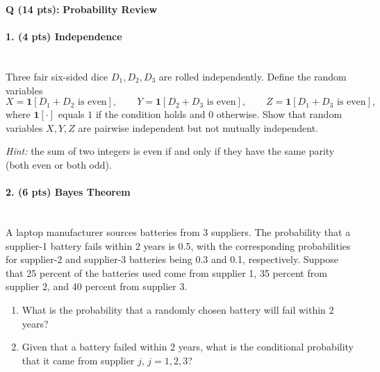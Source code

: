 \documentclass{article}
\newcounter{questionno}
\newcounter{partno}
\newcommand{\question}[1]{
\noindent
\newline
\stepcounter{questionno}
\setcounter{partno}{0}
{\bf \large Q\arabic{questionno} (#1 pts): }
}
\begin{document}
\newpage

\question{14} {\bf \large Probability Review}
\paragraph{1. (4 pts) Independence }~\\

Three fair six-sided dice $D_1, D_2, D_3$ are rolled independently. Define the random variables
\[
X = \mathbf{1}[D_1 + D_2 \text{ is even}],\qquad
Y = \mathbf{1}[D_2 + D_3 \text{ is even}],\qquad
Z = \mathbf{1}[D_1 + D_3 \text{ is even}],
\]
where $\mathbf{1}[\cdot]$ equals $1$ if the condition holds and $0$ otherwise.
Show that random variables $X, Y, Z$ are pairwise independent but not mutually independent.

\emph{Hint:} the sum of two integers is even if and only if they have the same parity (both even or both odd).

\begin{tcolorbox}[breakable,enhanced,notitle,width=16.6cm,height=15cm]

\end{tcolorbox}

\newpage

\paragraph{2. ({\bf 6 pts}) Bayes Theorem  } ~\\

A laptop manufacturer sources batteries from 3 suppliers. The probability that a supplier-1 battery fails within 2 years is 0.5, with the corresponding probabilities for supplier-2 and supplier-3 batteries being 0.3 and 0.1, respectively. Suppose that 25 percent of the batteries used come from supplier 1, 35 percent from supplier 2, and 40 percent from supplier 3.

\begin{enumerate}
    \item What is the probability that a randomly chosen battery will fail within 2 years?
    \item Given that a battery failed within 2 years, what is the conditional probability that it came from supplier $j$, $j=1,2,3$?
\end{enumerate}

\begin{tcolorbox}[breakable,enhanced,notitle,width=16.6cm,height=15cm]

\end{tcolorbox}
\end{document}
